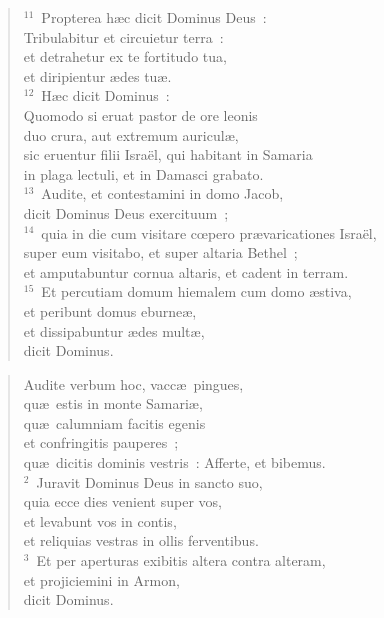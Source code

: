 \begin{flushleft}
\begin{verse}
${}^{11}$~Propterea h\ae c dicit Dominus Deus~:\\ Tribulabitur et circuietur terra~:\\ et detrahetur ex te fortitudo tua,\\ et diripientur \ae des tu\ae .\\
${}^{12}$~H\ae c dicit Dominus~:\\ Quomodo si eruat pastor de ore leonis\\ duo crura, aut extremum auricul\ae ,\\ sic eruentur filii Isra\"el, qui habitant in Samaria\\ in plaga lectuli, et in Damasci grabato.\\
${}^{13}$~Audite, et contestamini in domo Jacob,\\ dicit Dominus Deus exercituum~;\\
${}^{14}$~quia in die cum visitare cœpero pr\ae varicationes Isra\"el,\\ super eum visitabo, et super altaria Bethel~;\\ et amputabuntur cornua altaris, et cadent in terram.\\
${}^{15}$~Et percutiam domum hiemalem cum domo \ae stiva,\\ et peribunt domus eburne\ae ,\\ et dissipabuntur \ae des mult\ae ,\\ dicit Dominus.\end{verse}\end{flushleft}


\begin{flushleft}\begin{verse}\vspace{-19pt}Audite verbum hoc, vacc\ae\ pingues,\\ qu\ae\ estis in monte Samari\ae ,\\ qu\ae\ calumniam facitis egenis\\ et confringitis pauperes~;\\ qu\ae\ dicitis dominis vestris~: Afferte, et bibemus.\\
${}^{2}$~Juravit Dominus Deus in sancto suo,\\ quia ecce dies venient super vos,\\ et levabunt vos in contis,\\ et reliquias vestras in ollis ferventibus.\\
${}^{3}$~Et per aperturas exibitis altera contra alteram,\\ et projiciemini in Armon,\\ dicit Dominus.\end{verse}\end{flushleft}


